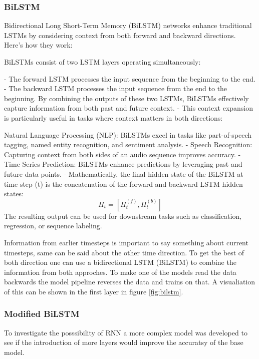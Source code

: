 \subsubsection{BiLSTM}

Bidirectional Long Short-Term Memory (BiLSTM) networks enhance traditional LSTMs by considering context from both forward and backward directions. Here’s how they work:

BiLSTMs consist of two LSTM layers operating simultaneously:

- The forward LSTM processes the input sequence from the beginning to the end.
- The backward LSTM processes the input sequence from the end to the beginning. By combining the outputs of these two LSTMs, BiLSTMs effectively capture information from both past and future context.
- This context expansion is particularly useful in tasks where context matters in both directions:

Natural Language Processing (NLP): BiLSTMs excel in tasks like part-of-speech tagging, named entity recognition, and sentiment analysis.
- Speech Recognition: Capturing context from both sides of an audio sequence improves accuracy.
- Time Series Prediction: BiLSTMs enhance predictions by leveraging past and future data points.
- Mathematically, the final hidden state of the BiLSTM at time step (t) is the concatenation of the forward and backward LSTM hidden states: \[ H_t = [H_t^{(f)}, H_t^{(b)}] \] The resulting output can be used for downstream tasks such as classification, regression, or sequence labeling.

Information from earlier timesteps is important to say something about current timesteps, same can be said about the other time direction. To get the best of both direction one can use a bidirectional LSTM (BiLSTM) to combine the information from both approches. To make one of the models read the data backwards the model pipeline reverses the data and trains on that. A visualiation of this can be shown in the first layer in figure \ref{fig:bilstm}.

\subsubsection{Modified BiLSTM}

To investigate the posssibility of RNN a more complex model was developed to see if the introduction of more layers would improve the accuratsy of the base model. 

